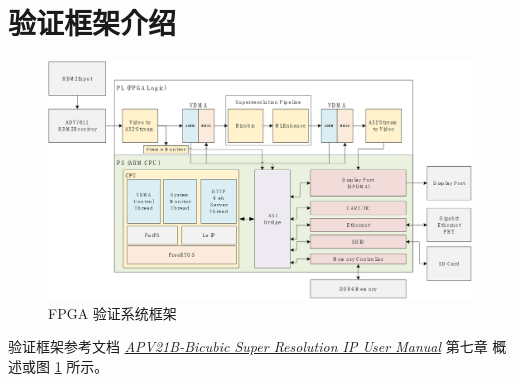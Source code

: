 \documentclass[12pt, a4paper, oneside]{ctexbook}
\begin{document}
    \section{验证框架介绍}
   		\begin{figure}
   			\centering
   			\includegraphics[scale=0.5]{pic/Architecture.png}
   			\caption{FPGA 验证系统框架}
   			\label{architecture}
   		\end{figure}
    验证框架参考文档 \href{../../00 IP User Manual (All Specs)/APV21B_Bicubic_Super_Resolution_IP_UM.pdf}{\textit{APV21B-Bicubic Super Resolution IP User Manual}} 第七章 概述或图 \ref{architecture} 所示。
\end{document}
